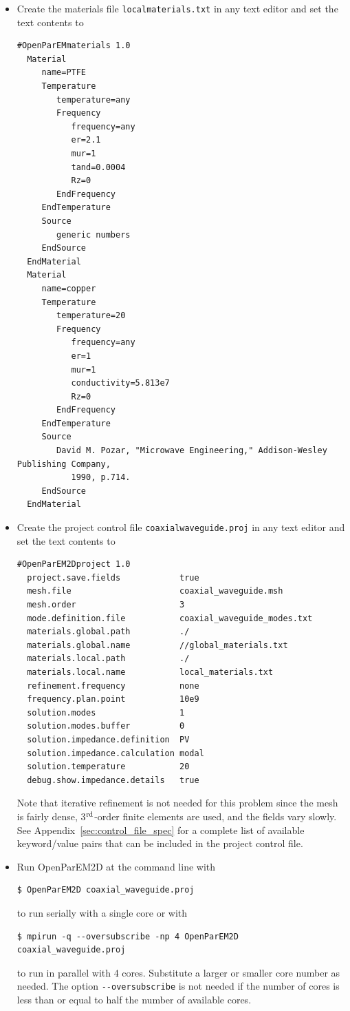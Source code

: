 \documentclass[titlepage]{article}
\renewcommand\_{\textunderscore\linebreak[1]}
\begin{document}
\begin{itemize}

\item Create the materials file \texttt{local\_materials.txt} in any text editor and set the text contents to
\begin{Verbatim}[fontsize=\small]
  #OpenParEMmaterials 1.0
  Material
     name=PTFE
     Temperature
        temperature=any
        Frequency
           frequency=any
           er=2.1
           mur=1
           tand=0.0004
           Rz=0
        EndFrequency
     EndTemperature
     Source
        generic numbers
     EndSource
  EndMaterial
  Material
     name=copper
     Temperature
        temperature=20
        Frequency
           frequency=any
           er=1
           mur=1
           conductivity=5.813e7
           Rz=0
        EndFrequency
     EndTemperature
     Source
        David M. Pozar, "Microwave Engineering," Addison-Wesley Publishing Company,
           1990, p.714.
     EndSource
  EndMaterial
\end{Verbatim}
\item Create the project control file \texttt{coaxial\_waveguide.proj} in any text editor and set the text contents to
\begin{Verbatim}[fontsize=\small]
  #OpenParEM2Dproject 1.0
  project.save.fields            true
  mesh.file                      coaxial_waveguide.msh
  mesh.order                     3
  mode.definition.file           coaxial_waveguide_modes.txt
  materials.global.path          ./
  materials.global.name          //global_materials.txt
  materials.local.path           ./
  materials.local.name           local_materials.txt
  refinement.frequency           none
  frequency.plan.point           10e9
  solution.modes                 1
  solution.modes.buffer          0
  solution.impedance.definition  PV
  solution.impedance.calculation modal
  solution.temperature           20
  debug.show.impedance.details   true
\end{Verbatim}

\noindent Note that iterative refinement is not needed for this problem since the mesh is fairly dense, 3$^{\textnormal{rd}}$-order finite elements are used, and the fields vary slowly.  See Appendix~\ref{sec:control_file_spec} for a complete list of available keyword/value pairs that can be included in the project control file.

\item Run OpenParEM2D at the command line with
\begin{Verbatim}[fontsize=\small]
   $ OpenParEM2D coaxial_waveguide.proj
\end{Verbatim}
to run serially with a single core or with
\begin{Verbatim}[fontsize=\small]
   $ mpirun -q --oversubscribe -np 4 OpenParEM2D coaxial_waveguide.proj
\end{Verbatim}
to run in parallel with 4 cores.  Substitute a larger or smaller core number as needed.  The option \verb+--oversubscribe+ is not needed if the number of cores is less than or equal to half the number of available cores.
\end{itemize}
\end{document}
